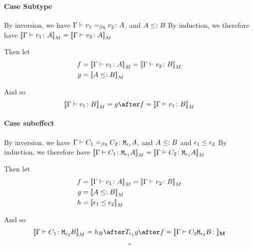 {    \paragraph{Case Subtype}
    By inversion, we have $\Gamma \vdash v_1 =_{\beta\eta} v_2 \colon A$, and $A \leq: B$ 
    By induction, we therefore have ${\bf [\![}\Gamma \vdash v_1 \colon A{\bf ]\!]}_M = {\bf [\![}\Gamma \vdash v_2 \colon A{\bf ]\!]}_M$

    Then let
    \begin{align}
        f &{}={\bf [\![}\Gamma \vdash v_1 \colon A{\bf ]\!]}_M = {\bf [\![}\Gamma \vdash v_2 \colon B{\bf ]\!]}_M\\
        g &{}={\bf [\![}A \leq: B{\bf ]\!]}_M
    \end{align}



    And so
    \begin{equation}
            \deno{\gtyperelation{v_1}{B}} = g \after f = \deno{\gtyperelation{v_1}{B}}
    \end{equation}
    \paragraph{Case subeffect}
    By inversion, we have $\Gamma \vdash C_1 =_{\beta\eta} C_2 \colon \texttt{M}_{\epsilon_1}{A}$, and $A \leq: B$ and $\epsilon_1 \leq \epsilon_2$
    By induction, we therefore have ${\bf [\![}\Gamma \vdash C_1 \colon \texttt{M}_{\epsilon_1}{A}{\bf ]\!]}_M = {\bf [\![}\Gamma \vdash C_2 \colon \texttt{M}_{\epsilon_1}{A}{\bf ]\!]}_M$

    Then let
    \begin{align}
        f &{}=\deno{\gtyperelation{v_1}{A}} = \deno{\gtyperelation{v_2}{B}}\\
        g &{}=\deno{A \subtype B}\\
        h &{}=\deno{\e_1\subeffect\e_2}
    \end{align}

    And so
    \begin{equation}
            \deno{\gtyperelation{C_1}{\M{\e_2}{B}}} = h_B \after \T{\e_1}{g} \after f = \deno{\gtyperelation{C_2{\M{\e_2}{B}}}}
    \end{equation}

    $$\square$$
}

\ifdefined\NoDocument
\else
\documentclass{report}





   \BetaEtaEquivalence

\fi